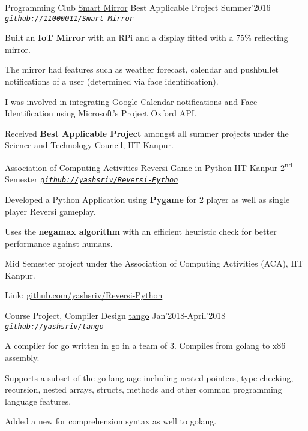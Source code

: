 \begin{cventries}
  \smallcventry
  {Programming Club}
  {\href{http://pclub.in/project/2016/07/06/smartmirror.html}{Smart Mirror}}
  {Best Applicable Project}
  {Summer'2016}
  {\emph{\texttt{\href{https://github.com/11000011/Smart-Mirror}{github://11000011/Smart-Mirror}}}}
  {
    \begin{cvitems}
    \item Built an \textbf{IoT Mirror} with an RPi and a display fitted with a 75\%
      reflecting mirror.
    \item The mirror had features such as weather forecast, calendar
      and pushbullet notifications of a user (determined via face
      identification).
      \item I was involved in integrating Google Calendar notifications and Face
        Identification using Microsoft’s Project Oxford API.
    \item Received \textbf{Best Applicable Project} amongst all summer projects under
      the Science and Technology Council, IIT Kanpur.
    \end{cvitems}
  }

  \smallcventry
  {Association of Computing Activities}
  {\href{https://github.com/yashsriv/Reversi-Python}{Reversi Game in Python}}
  {IIT Kanpur}
  {2\textsuperscript{nd} Semester}
  {\emph{\texttt{\href{https://github.com/yashsriv/Reversi-Python}{github://yashsriv/Reversi-Python}}}}
  {
    \begin{cvitems}
    \item Developed a Python Application using \textbf{Pygame} for 2 player as well as
      single player Reversi gameplay.
    \item Uses the \textbf{negamax algorithm} with an efficient heuristic check
      for better performance against humans.
    \item Mid Semester project under the Association of Computing Activities (ACA), IIT Kanpur.
    \item Link: \href{https://github.com/yashsriv/Reversi-Python}{github.com/yashsriv/Reversi-Python}
    \end{cvitems}
  }


  \smallcventry
  {Course Project, Compiler Design}
  {\href{https://github.com/yashsriv/tango}{tango}  }
  {}
  {Jan'2018-April'2018}
  {\emph{\texttt{\href{https://github.com/yashsriv/tango}{github://yashsriv/tango}}}}
  {
    \begin{cvitems}
    \item A compiler for go written in go in a team of 3. Compiles from golang
      to x86 assembly.
    \item Supports a subset of the go language including nested pointers, type
      checking, recursion, nested arrays, structs, methods and other common
      programming language features.
    \item Added a new for comprehension syntax as well to golang.
    \end{cvitems}
  }


\end{cventries}
